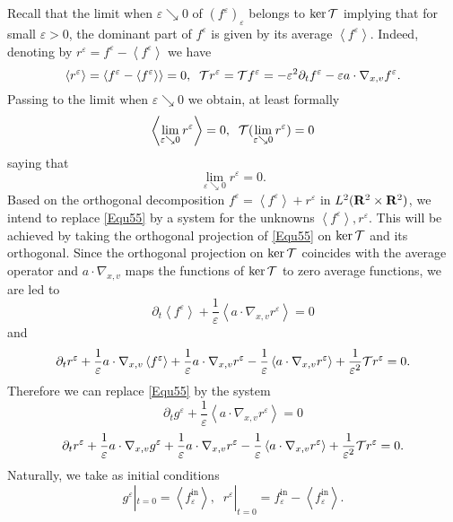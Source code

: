 \documentclass[12pt, a4paper]{article}
\providecommand\mathbb{\bf}
\newcommand\R{{\mathbb R}}
\newcommand{\eps}[0]{
\varepsilon}
\newcommand{\fe}[0]{
f ^\varepsilon}
\newcommand{\re}[0]{
r ^\varepsilon}
\newcommand{\geps}[0]{
g ^\varepsilon}
\newcommand{\fine}[0]{
f ^{\mathrm{in}}_{\varepsilon}}
\newcommand{\ltxv}[0]{
L^2(\R ^2 \times \R ^2)}
\newcommand{\nxv}[0]{
\nabla_{x,v}}
\newcommand{\ave}[1]{
\left \langle #1 \right \rangle }
\newcommand{\lime}[0]{
\lim _{\varepsilon \searrow 0}}
\begin{document}
Recall that the limit when $\eps \searrow 0 $ of $(\fe)_\eps $ belongs to $\ker {\cal T}$ implying that for small $\eps >0$, the dominant part of $\fe$ is given by its average $\ave{\fe}$. Indeed, denoting by $\re = \fe - \ave{\fe}$ we have
\[
\ave{\re} = \ave{\fe - \ave{\fe}} = 0,\;\;{\cal T} \re = {\cal T} \fe = - \eps ^2 \partial _t \fe - \eps a \cdot \nxv \fe.
\]
Passing to the limit when $\eps \searrow 0$ we obtain, at least formally
\[
\ave{\lime \re} = 0,\;\;{\cal T} (\lime \re) = 0
\]
saying that 
\begin{equation}
\label{Equ58} \lime \re = 0.
\end{equation}
Based on the orthogonal decomposition $\fe = \ave{\fe} + \re $ in $\ltxv$, we intend to replace \eqref{Equ55} by a system for the unknowns $\ave{\fe}, \re$. This will be achieved by taking the orthogonal projection of \eqref{Equ55} on $\ker {\cal T}$ and its orthogonal. Since the orthogonal projection on $\ker {\cal T}$  coincides with the average operator and $a \cdot \nxv $ maps the functions of $\ker {\cal T}$ to zero average functions, we are led to
\begin{equation}
\label{Equ59} \partial _t \ave{\fe} + \frac{1}{\eps} \ave{a \cdot \nxv \re} = 0
\end{equation}
and
\begin{equation}
\label{Equ60} \partial _t \re + \frac{1}{\eps} a \cdot \nxv \ave{\fe} + \frac{1}{\eps} a \cdot \nxv \re - \frac{1}{\eps} \ave{a \cdot \nxv \re } + \frac{1}{\eps ^2} {\cal T} \re = 0.
\end{equation}
Therefore we can replace \eqref{Equ55} by the system
\begin{equation}
\label{Equ61} \partial _t \geps + \frac{1}{\eps} \ave{ a \cdot \nxv \re} = 0
\end{equation}
\begin{equation}
\label{Equ62} \partial _t \re + \frac{1}{\eps} a \cdot \nxv \geps + \frac{1}{\eps} a \cdot \nxv \re - \frac{1}{\eps} \ave{a \cdot \nxv \re} + \frac{1}{\eps ^2} {\cal T} \re = 0.
\end{equation}
Naturally, we take as initial conditions
\begin{equation}
\label{Equ63} \geps | _{t = 0} = \ave{\fine},\;\;\re |_{t = 0} = \fine - \ave{\fine}.
\end{equation}
\end{document}
